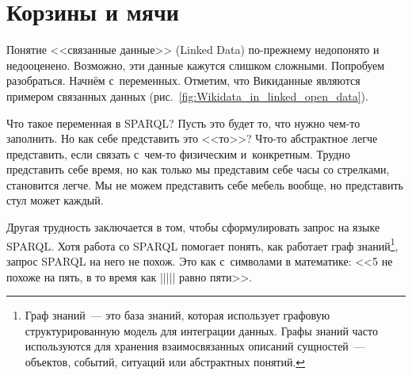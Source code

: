 \chapter{Корзины и мячи}
\label{ch:BucketsAndBalls}

Понятие <<связанные данные>> (Linked Data) по-прежнему недопонято и недооценено. 
Возможно, эти данные кажутся слишком сложными. 
Попробуем разобраться. Начнём с~переменных. 
Отметим, что Викиданные являются примером связанных данных (рис.~\ref{fig:Wikidata_in_linked_open_data}).


Что такое переменная в SPARQL? Пусть это будет то, что нужно чем-то заполнить. 
Но как себе представить это <<то>>? Что-то абстрактное легче представить, 
если связать с~чем-то физическим и~конкретным. 
Трудно представить себе время, но как только мы представим себе часы со стрелками, становится легче. Мы не можем представить себе мебель вообще, но представить стул может каждый.

Другая трудность заключается в том, 
чтобы сформулировать запрос на языке SPARQL. 
Хотя работа со SPARQL помогает понять, как работает граф знаний\footnote[][12pt]{%
%
%
Граф знаний~--- это база знаний, которая использует графовую структурированную модель для интеграции данных. 
Графы знаний часто используются для хранения взаимосвязанных описаний сущностей~--- объектов, 
событий, ситуаций или абстрактных понятий. 
}, 
запрос SPARQL на него не похож. Это как с~символами в математике: <<5 не похоже на пять, в то время как ||||| равно пяти>>.

